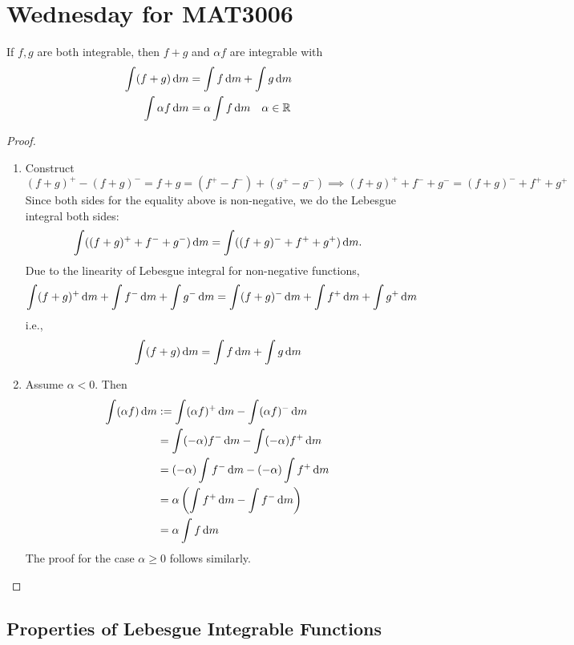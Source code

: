 
\section{Wednesday for MAT3006}
\begin{proposition}[Linearity]
If $f,g$ are both integrable, then $f+g$ and $\alpha f$ are integrable with
\begin{align*}
\int(f+g)\,\mathrm{d} m &= \int f\,\mathrm{d} m+\int g\,\mathrm{d} m\\
\int\alpha f\,\mathrm{d} m &= \alpha\int f\,\mathrm{d} m\quad \alpha\in\mathbb{R}
\end{align*}
\end{proposition}
\begin{proof}
\begin{enumerate}
\item
Construct
\[
(f+g)^+ - (f+g)^- = f+g
=
(f^+ - f^-) + (g^+ - g^-)
\implies
(f+g)^+ + f^- + g^- = (f+g)^- + f^++g^+
\]
Since both sides for the equality above is non-negative, we do the Lebesgue integral both sides:
\[
\int((f+g)^+ + f^- + g^- )\,\mathrm{d} m
=
\int((f+g)^- + f^++g^+ )\,\mathrm{d} m.
\]
Due to the linearity of Lebesgue integral for non-negative functions, 
\[
\int (f+g)^+\,\mathrm{d} m +\int f^-\,\mathrm{d} m+\int g^-\,\mathrm{d} m
=
\int(f+g)^-\,\mathrm{d} m+\int f^+\,\mathrm{d} m+\int g^+\,\mathrm{d} m
\]
i.e.,
\[
\int(f+g)\,\mathrm{d} m = \int f\,\mathrm{d} m+\int g\,\mathrm{d} m
\]
\item
Assume $\alpha<0$. Then
\begin{align*}
\int(\alpha f)\,\mathrm{d} m&:=\int(\alpha f)^+\,\mathrm{d} m - \int(\alpha f)^-\,\mathrm{d} m\\
&=\int(-\alpha)f^-\,\mathrm{d} m - \int(-\alpha)f^+\,\mathrm{d} m\\
&=(-\alpha)\int f^-\,\mathrm{d} m - (-\alpha)\int f^+\,\mathrm{d} m\\
&=\alpha\left(\int f^+\,\mathrm{d} m - \int f^-\,\mathrm{d} m\right)\\
&=\alpha \int f\,\mathrm{d} m
\end{align*}
The proof for the case $\alpha\ge0$ follows similarly.
\end{enumerate}
\end{proof}
\subsection{Properties of Lebesgue Integrable Functions}

